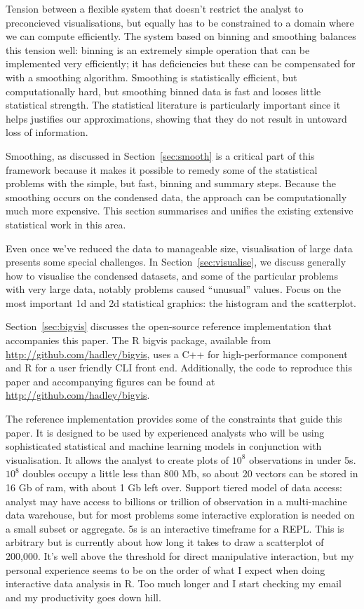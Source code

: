 \documentclass[journal]{vgtc}                %
\begin{document}
Tension between a flexible system that doesn't restrict the analyst to preconcieved visualisations, but equally has to be constrained to a domain where we can compute efficiently. The system based on binning and smoothing balances this tension well: binning is an extremely simple operation that can be implemented very efficiently; it has deficiencies but these can be compensated for with a smoothing algorithm. Smoothing is statistically efficient, but computationally hard, but smoothing binned data is fast and looses little statistical strength. The statistical literature is particularly important since it helps justifies our approximations, showing that they do not result in untoward loss of information.

Smoothing, as discussed in Section~\ref{sec:smooth} is a critical part of this framework because it makes it possible to remedy some of the statistical problems with the simple, but fast, binning and summary steps. Because the smoothing occurs on the condensed data, the approach can be computationally much more expensive. This section summarises and unifies the existing extensive statistical work in this area.

Even once we've reduced the data to manageable size, visualisation of large data presents some special challenges. In Section~\ref{sec:visualise}, we discuss generally how to visualise the condensed datasets, and some of the particular problems with very large data, notably problems caused ``unusual'' values.  Focus on the most important 1d and 2d statistical graphics: the histogram and the scatterplot.

Section~\ref{sec:bigvis} discusses the open-source reference implementation that accompanies this paper. The R \citep{R} bigvis package, available from \url{http://github.com/hadley/bigvis}, uses a C++ for high-performance component and R for a user friendly CLI front end.  Additionally, the code to reproduce this paper and accompanying figures can be found at \url{http://github.com/hadley/bigvis}.

The reference implementation provides some of the constraints that guide this paper. It is designed to be used by experienced analysts who will be using  sophisticated statistical and machine learning models in conjunction with visualisation.  It allows the analyst to create plots of $10^8$ observations in under 5s. $10^8$ doubles occupy a little less than 800 Mb, so about 20 vectors can be stored in 16 Gb of ram, with about 1 Gb left over. Support tiered model of data access: analyst may have access to billions or trillion of observation in a multi-machine data warehouse, but for most problems some interactive exploration is needed on a small subset or aggregate. 5s is an interactive timeframe for a REPL.  This is arbitrary but is currently about how long it takes to draw a scatterplot of 200,000. It's well above the threshold for direct manipulative interaction, but my personal experience seems to be on the order of what I expect when doing interactive data analysis in R.  Too much longer and I start checking my email and my productivity goes down hill.
\end{document}
